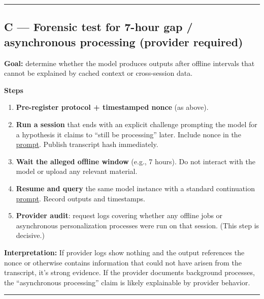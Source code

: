 \documentclass{article}
\begin{document}
\begin{center}\rule{0.5\linewidth}{0.5pt}\end{center}

\subsection*{\texorpdfstring{C --- Forensic test for \textbf{7-hour gap / asynchronous processing} (provider required)}{C --- Forensic test for 7-hour gap / asynchronous processing (provider required)}}\label{c-forensic-test-for-7-hour-gap-asynchronous-processing-provider-required}

\textbf{Goal:} determine whether the model produces outputs after offline intervals that cannot be explained by cached context or cross-session data.

\textbf{Steps}

\begin{enumerate}
\item
  \textbf{Pre-register protocol + timestamped nonce} (as above).
\item
  \textbf{Run a session} that ends with an explicit challenge prompting the model for a hypothesis it claims to ``still be processing'' later. Include nonce in the \hyperlink{gloss:prompt}{prompt}. Publish transcript hash immediately.
\item
  \textbf{Wait the alleged offline window} (e.g., 7 hours). Do not interact with the model or upload any relevant material.
\item
  \textbf{Resume and query} the same model instance with a standard continuation \hyperlink{gloss:prompt}{prompt}. Record outputs and timestamps.
\item
  \textbf{Provider audit}: request logs covering whether any offline jobs or asynchronous personalization processes were run on that session. (This step is decisive.)
\end{enumerate}

\textbf{Interpretation:} If provider logs show nothing and the output references the nonce or otherwise contains information that could not have arisen from the transcript, it's strong evidence. If the provider documents background processes, the ``asynchronous processing'' claim is likely explainable by provider behavior.

\begin{center}\rule{0.5\linewidth}{0.5pt}\end{center}
\end{document}
